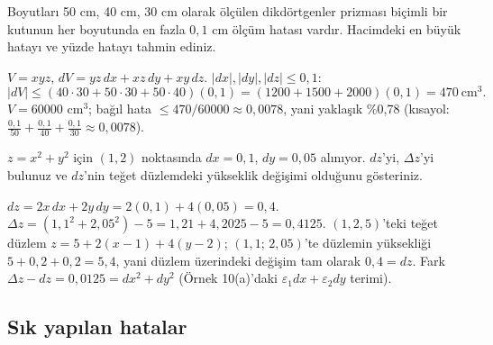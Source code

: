 \begin{soru}
Boyutları 50 cm, 40 cm, 30 cm olarak ölçülen dikdörtgenler prizması biçimli bir kutunun her boyutunda en fazla
$0{,}1$ cm ölçüm hatası vardır. Hacimdeki en büyük hatayı ve yüzde hatayı tahmin ediniz.
\end{soru}
\begin{cevap}
$V=xyz$, $dV=yz\,dx+xz\,dy+xy\,dz$. $|dx|,|dy|,|dz|\le0{,}1$:
\[ |dV|\le(40\cdot30+50\cdot30+50\cdot40)(0{,}1)=(1200+1500+2000)(0{,}1)=470\ \text{cm}^3 . \]
$V=60000$ cm$^3$; bağıl hata $\le470/60000\approx0{,}0078$, yani yaklaşık \%0,78
(kısayol: $\frac{0{,}1}{50}+\frac{0{,}1}{40}+\frac{0{,}1}{30}\approx0{,}0078$).
\end{cevap}

\begin{soru}
$z=x^2+y^2$ için $(1,2)$ noktasında $dx=0{,}1$, $dy=0{,}05$ alınıyor. $dz$'yi, $\Delta z$'yi bulunuz ve $dz$'nin teğet
düzlemdeki yükseklik değişimi olduğunu gösteriniz.
\end{soru}
\begin{cevap}
$dz=2x\,dx+2y\,dy=2(0{,}1)+4(0{,}05)=0{,}4$. $\Delta z=(1{,}1^2+2{,}05^2)-5=1{,}21+4{,}2025-5=0{,}4125$.
$(1,2,5)$'teki teğet düzlem $z=5+2(x-1)+4(y-2)$; $(1{,}1;\,2{,}05)$'te düzlemin yüksekliği $5+0{,}2+0{,}2=5{,}4$, yani
düzlem üzerindeki değişim tam olarak $0{,}4=dz$. Fark $\Delta z-dz=0{,}0125=dx^2+dy^2$ (Örnek 10(a)'daki
$\varepsilon_1dx+\varepsilon_2dy$ terimi).
\end{cevap}

\subsection{Sık yapılan hatalar}

